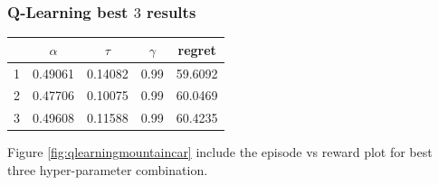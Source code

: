 \documentclass[11pt, a4]{article}
\begin{document}
			\subsubsection{Q-Learning best $3$ results}
				\begin{center}
					\begin{tabular}{|c|c|c|c|c|}
						\hline
						& $\alpha$ & $\tau$ & $\gamma$ & regret\\
						\hline
						1 & 0.49061 & 0.14082 & 0.99 & 59.6092\\
						\hline
						2 & 0.47706 & 0.10075 & 0.99 &60.0469\\
						\hline
						3 & 0.49608 & 0.11588 & 0.99 &60.4235\\
						\hline
					\end{tabular}
				\end{center}
				Figure \ref{fig:qlearningmountaincar} include the episode vs reward plot for best three hyper-parameter combination.
\end{document}

